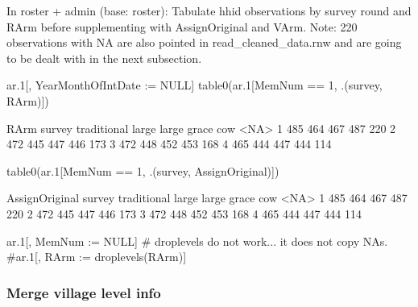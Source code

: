 In \textsf{roster + admin} (base: roster): Tabulate \textsf{hhid} observations by \textsf{survey} round and \textsf{RArm} before supplementing with \textsf{AssignOriginal} and \textsf{VArm}. Note: 220 observations with NA are also pointed in \textsf{read\_cleaned\_data.rnw} and are going to be dealt with in the next subsection.
\begin{Schunk}
\begin{Sinput}
ar.1[, YearMonthOfIntDate := NULL]
table0(ar.1[MemNum == 1, .(survey, RArm)])
\end{Sinput}
\begin{Soutput}
      RArm
survey traditional large large grace cow <NA>
     1         485   464         467 487  220
     2         472   445         447 446  173
     3         472   448         452 453  168
     4         465   444         447 444  114
\end{Soutput}
\begin{Sinput}
table0(ar.1[MemNum == 1, .(survey, AssignOriginal)])
\end{Sinput}
\begin{Soutput}
      AssignOriginal
survey traditional large large grace cow <NA>
     1         485   464         467 487  220
     2         472   445         447 446  173
     3         472   448         452 453  168
     4         465   444         447 444  114
\end{Soutput}
\begin{Sinput}
ar.1[, MemNum := NULL]
# droplevels do not work... it does not copy NAs.
#ar.1[, RArm := droplevels(RArm)]
\end{Sinput}
\end{Schunk}

\subsubsection{Merge village level info}

